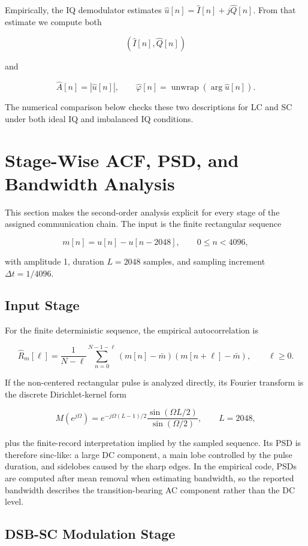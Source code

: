 \documentclass[11pt]{article}
\begin{document}
Empirically, the IQ demodulator estimates $\widehat{u}[n]=\widehat{I}[n]+j\widehat{Q}[n]$. From that estimate we compute both

\[
(\widehat{I}[n],\widehat{Q}[n])
\]

and

\[
\widehat{A}[n]=|\widehat{u}[n]|,
\qquad
\widehat{\varphi}[n]=\operatorname{unwrap}(\arg \widehat{u}[n]).
\]

The numerical comparison below checks these two descriptions for LC and SC under both ideal IQ and imbalanced IQ conditions.

\section{Stage-Wise ACF, PSD, and Bandwidth Analysis}

This section makes the second-order analysis explicit for every stage of the assigned communication chain. The input is the finite rectangular sequence

\[
m[n]=u[n]-u[n-2048],
\qquad
0\leq n<4096,
\]

with amplitude 1, duration $L=2048$ samples, and sampling increment $\Delta t=1/4096$.

\subsection{Input Stage}

For the finite deterministic sequence, the empirical autocorrelation is

\[
\widehat{R}_m[\ell]=\frac{1}{N-\ell}\sum_{n=0}^{N-1-\ell}(m[n]-\bar m)(m[n+\ell]-\bar m),
\qquad
\ell\geq 0.
\]

If the non-centered rectangular pulse is analyzed directly, its Fourier transform is the discrete Dirichlet-kernel form

\[
M(e^{j\Omega})=e^{-j\Omega(L-1)/2}\frac{\sin(\Omega L/2)}{\sin(\Omega/2)},
\qquad
L=2048,
\]

plus the finite-record interpretation implied by the sampled sequence. Its PSD is therefore sinc-like: a large DC component, a main lobe controlled by the pulse duration, and sidelobes caused by the sharp edges. In the empirical code, PSDs are computed after mean removal when estimating bandwidth, so the reported bandwidth describes the transition-bearing AC component rather than the DC level.

\subsection{DSB-SC Modulation Stage}
\end{document}

